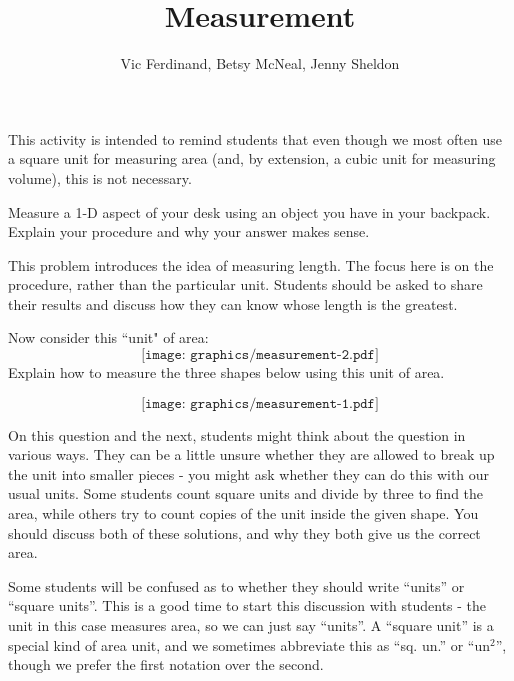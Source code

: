 \documentclass[handout]{ximera}
\title{Measurement}
\author{Vic Ferdinand, Betsy McNeal, Jenny Sheldon}
\begin{document}
\begin{abstract}
\end{abstract}
\maketitle

\begin{instructorIntro}
This activity is intended to remind students that even though we most often use a square unit for measuring area (and, by extension, a cubic unit for measuring volume), this is not necessary.


\end{instructorIntro}

\begin{problem}

Measure a 1-D aspect of your desk using an object you have in your backpack.  Explain your procedure and why your answer makes sense.  

\begin{instructorIntro}
This problem introduces the idea of measuring length.  The focus here is on the procedure, rather than the particular unit.  Students should be asked to share their results and discuss how they can know whose length is the greatest.
\end{instructorIntro}
\end{problem}


\begin{problem}
Now consider this ``unit" of area:
 \[
\texttt{[image: graphics/measurement-2.pdf]}
\]
Explain how to measure the three shapes below using this unit of area.

\[
\texttt{[image: graphics/measurement-1.pdf]}
\]


\begin{instructorNotes}
    On this question and the next, students might think about the question in various ways.  They can be a little unsure whether they are allowed to break up the unit into smaller pieces - you might ask whether they can do this with our usual units.  Some students count square units and divide by three to find the area, while others try to count copies of the unit inside the given shape.  You should discuss both of these solutions, and why they both give us the correct area.
    
    Some students will be confused as to whether they should write ``units'' or ``square units''.  This is a good time to start this discussion with students - the unit in this case measures area, so we can just say ``units''.  A ``square unit'' is a special kind of area unit, and we sometimes abbreviate this as ``sq. un.'' or ``un$^2$'', though we prefer the first notation over the second.
\end{instructorNotes}
\end{problem}
\end{document}
